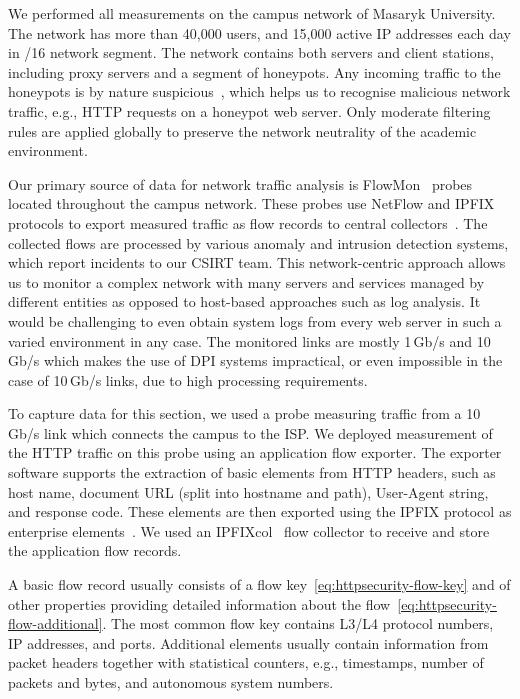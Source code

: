 We performed all measurements on the campus network of Masaryk University. The network has more than 40,000 users, and 15,000 active IP addresses each day in /16 network segment. The network contains both servers and client stations, including proxy servers and a segment of honeypots. Any incoming traffic to the honeypots is by nature suspicious~\cite{Provos-2007-Virtual}, which helps us to recognise malicious network traffic, e.g., HTTP requests on a honeypot web server. Only moderate filtering rules are applied globally to preserve the network neutrality of the academic environment.

Our primary source of data for network traffic analysis is FlowMon~\cite{FlowmonNetworks--Flowmon} probes located throughout the campus network. These probes use NetFlow and IPFIX protocols to export measured traffic as flow records to central collectors~\cite{Hofstede-2014-Flow}. The collected flows are processed by various anomaly and intrusion detection systems, which report incidents to our CSIRT team. This network-centric approach allows us to monitor a complex network with many servers and services managed by different entities as opposed to host-based approaches such as log analysis. It would be challenging to even obtain system logs from every web server in such a varied environment in any case. The monitored links are mostly 1\,Gb/s and 10\,Gb/s which makes the use of DPI systems impractical, or even impossible in the case of 10\,Gb/s links, due to high processing requirements.

To capture data for this section, we used a probe measuring traffic from a 10\,Gb/s link which connects the campus to the ISP. We deployed measurement of the HTTP traffic on this probe using an application flow exporter. The exporter software supports the extraction of basic elements from HTTP headers, such as host name, document URL (split into hostname and path), User-Agent string, and response code. These elements are then exported using the IPFIX protocol as enterprise elements~\cite{rfc7011}. We used an IPFIXcol~\cite{Velan-2012-Flow} flow collector to receive and store the application flow records.

A basic flow record usually consists of a flow key~\eqref{eq:httpsecurity-flow-key} and of other properties providing detailed information about the flow~\eqref{eq:httpsecurity-flow-additional}. The most common flow key contains L3/L4 protocol numbers, IP addresses, and ports. Additional elements usually contain information from packet headers together with statistical counters, e.g., timestamps, number of packets and bytes, and autonomous system numbers.

